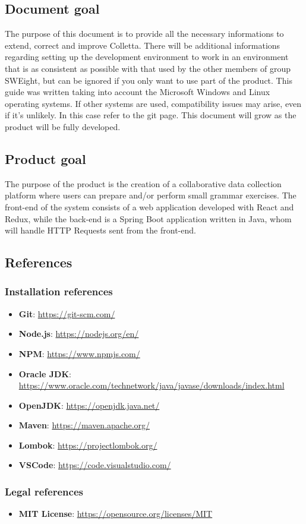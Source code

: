 \subsection{Document goal}
The purpose of this document is to provide all the necessary informations to extend, correct and improve Colletta.
There will be additional informations regarding setting up the development environment to work in an environment that is as consistent as possible with that used
by the other members of group SWEight, but can be ignored if you only want to use part of the product.
This guide was written taking into account the Microsoft Windows and Linux operating systems. If other systems are used, compatibility issues may arise, even if it’s unlikely. In this case refer to the git page. This document will grow as the product will be fully
developed.

\subsection{Product goal}
The purpose of the product is the creation of a collaborative data collection platform where users can prepare and/or perform small grammar exercises. 
The front-end of the system consists of a web application developed with React and Redux, while the back-end is a Spring Boot application written in Java, whom will handle HTTP Requests sent from the front-end. 

\subsection{References}


\subsubsection{Installation references}

\begin{itemize}
\item \textbf{Git}: \url{https://git-scm.com/}
\item \textbf{Node.js}: \url{https://nodejs.org/en/}
\item \textbf{NPM}: \url{https://www.npmjs.com/}
\item \textbf{Oracle JDK}: \url{https://www.oracle.com/technetwork/java/javase/downloads/index.html}
\item \textbf{OpenJDK}: \url{https://openjdk.java.net/}
\item \textbf{Maven}: \url{https://maven.apache.org/}
\item \textbf{Lombok}: \url{https://projectlombok.org/}
\item \textbf{VSCode}: \url{https://code.visualstudio.com/} 

\end{itemize}

\subsubsection{Legal references}
\begin{itemize}
\item \textbf{MIT License}: \url{https://opensource.org/licenses/MIT}
\end{itemize}

